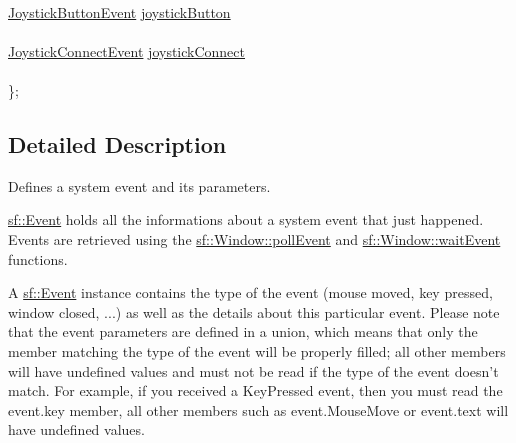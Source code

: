 \begin{DoxyCompactItemize}
\begin{tabbing}
\>\\
\>\hyperlink{structsf_1_1_event_1_1_joystick_button_event}{JoystickButtonEvent} \hyperlink{classsf_1_1_event_a42aad27a054c1c05bd5c3d020e1db174}{joystickButton}\\
\>\\
\>\hyperlink{structsf_1_1_event_1_1_joystick_connect_event}{JoystickConnectEvent} \hyperlink{classsf_1_1_event_aa354335c9ad73362442bc54ffe81118f}{joystickConnect}\\
\>\\
\}; \\

\end{tabbing}\end{DoxyCompactItemize}


\subsection{Detailed Description}
Defines a system event and its parameters. 

\hyperlink{classsf_1_1_event}{sf\-::\-Event} holds all the informations about a system event that just happened. Events are retrieved using the \hyperlink{classsf_1_1_window_a338e996585faf82e93069858e3b531b7}{sf\-::\-Window\-::poll\-Event} and \hyperlink{classsf_1_1_window_aaf02ab64fbc1d374eef3696df54137bc}{sf\-::\-Window\-::wait\-Event} functions.

A \hyperlink{classsf_1_1_event}{sf\-::\-Event} instance contains the type of the event (mouse moved, key pressed, window closed, ...) as well as the details about this particular event. Please note that the event parameters are defined in a union, which means that only the member matching the type of the event will be properly filled; all other members will have undefined values and must not be read if the type of the event doesn't match. For example, if you received a Key\-Pressed event, then you must read the event.\-key member, all other members such as event.\-Mouse\-Move or event.\-text will have undefined values.

